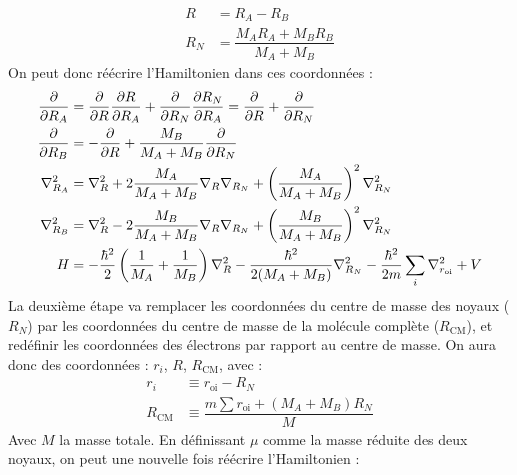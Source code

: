 \begin{align*}
    R &= R_A - R_B \\
    R_N &= \dfrac{M_AR_A + M_BR_B}{M_A+M_B}
\end{align*}
On peut donc réécrire l'Hamiltonien dans ces coordonnées :
\begin{align*}
    \dfrac{\partial}{\partial R_A} &=  \dfrac{\partial}{\partial R}\dfrac{\partial R}{\partial R_A} + \dfrac{\partial}{\partial R_N}\dfrac{\partial R_N}{\partial R_A} = \dfrac{\partial}{\partial R} + \dfrac{\partial}{\partial R_N} \\
    \dfrac{\partial}{\partial R_B} &= -\dfrac{\partial}{\partial R} + \dfrac{M_B}{M_A+M_B}\dfrac{\partial}{\partial R_N} \\
    \nabla^2_{R_A} &= \nabla^2_{R} + 2\dfrac{M_A}{M_A+M_B}\nabla_{R}\nabla_{R_N} + \left(\dfrac{M_A}{M_A+M_B}\right)^2\nabla^2_{R_N} \\
    \nabla^2_{R_B} &= \nabla^2_{R} - 2\dfrac{M_B}{M_A+M_B}\nabla_{R}\nabla_{R_N} + \left(\dfrac{M_B}{M_A+M_B}\right)^2\nabla^2_{R_N} \\
    H &= -\dfrac{\hbar^2}{2}\left(\dfrac{1}{M_A}+\dfrac{1}{M_B}\right)\nabla^2_{R} - \dfrac{\hbar^2}{2(M_A+M_B)}\nabla^2_{R_N} - \dfrac{\hbar^2}{2m}\sum\limits_i \nabla^2_{r_\text{oi}} +V
\end{align*}
La deuxième étape va remplacer les coordonnées du centre de masse des noyaux ($R_N$) par les coordonnées du centre de masse de la molécule complète ($R_\text{CM}$), et redéfinir les coordonnées des électrons par rapport au centre de masse. On aura donc des coordonnées : {$r_i$, $R$, $R_\text{CM}$}, avec :
\begin{align*}
    r_i &\equiv r_\text{oi} - R_N \\
    R_\text{CM} &\equiv \dfrac{m\sum r_\text{oi}+(M_A+M_B)R_N}{M}
\end{align*}
Avec $M$ la masse totale. En définissant $\mu$ comme la masse réduite des deux noyaux, on peut une nouvelle fois réécrire l'Hamiltonien :
